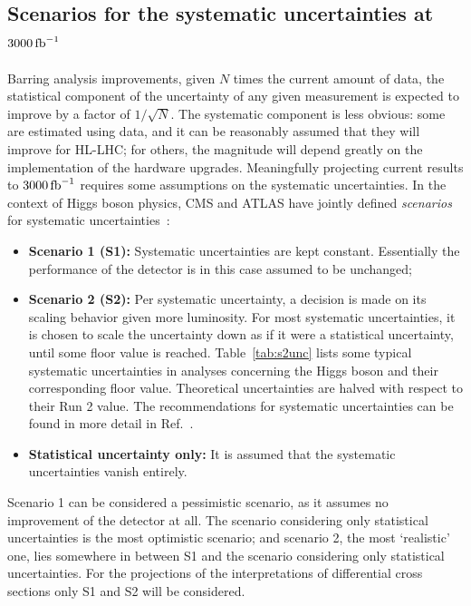 \subsection{Scenarios for the systematic uncertainties at \texorpdfstring{$3000\,\text{fb}^{-1}$}{3000 fb-1}}

Barring analysis improvements, given $N$ times the current amount of data, the statistical component of the uncertainty of any given measurement is expected to improve by a factor of $1/\sqrt{N}$.
% 
The systematic component is less obvious: some are estimated using data, and it can be reasonably assumed that they will improve for HL-LHC; for others, the magnitude will depend greatly on the implementation of the hardware upgrades.
% 
Meaningfully projecting current results to $3000\,\text{fb}^{-1}$ requires some assumptions on the systematic uncertainties.
% 
In the context of Higgs boson physics, CMS and ATLAS have jointly defined \textit{scenarios} for systematic uncertainties~\cite{s1s2talk}:
% 
\begin{itemize}
\item \textbf{Scenario 1 (S1):} Systematic uncertainties are kept constant. Essentially the performance of the detector is in this case assumed to be unchanged;
% 
\item \textbf{Scenario 2 (S2):} Per systematic uncertainty, a decision is made on its scaling behavior given more luminosity.
% 
For most systematic uncertainties, it is chosen to scale the uncertainty down as if it were a statistical uncertainty, until some floor value is reached.
% 
Table~\ref{tab:s2unc} lists some typical systematic uncertainties in analyses concerning the Higgs boson and their corresponding floor value.
% 
Theoretical uncertainties are halved with respect to their Run 2 value.
% 
The recommendations for systematic uncertainties can be found in more detail in Ref.~\cite{CMS:2018qgz}.
% 
\item \textbf{Statistical uncertainty only:} It is assumed that the systematic uncertainties vanish entirely.
\end{itemize}
% 
Scenario 1 can be considered a pessimistic scenario, as it assumes no improvement of the detector at all.
% 
The scenario considering only statistical uncertainties is the most optimistic scenario; and scenario 2, the most `realistic' one, lies somewhere in between S1 and the scenario considering only statistical uncertainties.
% 
For the projections of the interpretations of differential cross sections only S1 and S2 will be considered.


